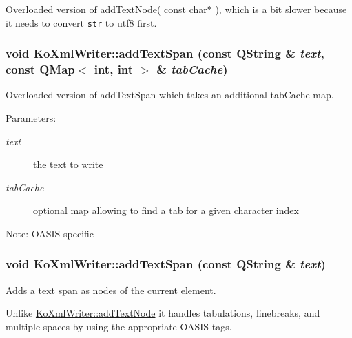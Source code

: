 Overloaded version of \hyperlink{classKoXmlWriter_354008d8e086577751b2cbee5bf973f2}{addTextNode( const char$\ast$ )}, which is a bit slower because it needs to convert {\tt str} to utf8 first. \hypertarget{classKoXmlWriter_609b2173ad0698a2f6f7a9b50beb5f0d}{
\subsubsection[{addTextSpan}]{\setlength{\rightskip}{0pt plus 5cm}void KoXmlWriter::addTextSpan (const QString \& {\em text}, \/  const QMap$<$ int, int $>$ \& {\em tabCache})}}
\label{classKoXmlWriter_609b2173ad0698a2f6f7a9b50beb5f0d}


Overloaded version of addTextSpan which takes an additional tabCache map. \begin{Desc}
\item[Parameters:]
\begin{description}
\item[{\em text}]the text to write \item[{\em tabCache}]optional map allowing to find a tab for a given character index \end{description}
\end{Desc}
\begin{Desc}
\item[Note:]OASIS-specific \end{Desc}
\hypertarget{classKoXmlWriter_c22324a2b86a2d5ed20026d9a47f353f}{
\subsubsection[{addTextSpan}]{\setlength{\rightskip}{0pt plus 5cm}void KoXmlWriter::addTextSpan (const QString \& {\em text})}}
\label{classKoXmlWriter_c22324a2b86a2d5ed20026d9a47f353f}


Adds a text span as nodes of the current element. 

Unlike \hyperlink{classKoXmlWriter_abee3ed993fcc913c3466083627843fc}{KoXmlWriter::addTextNode} it handles tabulations, linebreaks, and multiple spaces by using the appropriate OASIS tags.

